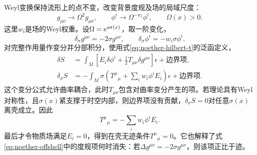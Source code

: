 \begin{example}[Weyl变换与迹恒等式]
Weyl变换保持流形上的点不变，改变背景度规及场的局域尺度：
\begin{equation}
    g_{\mu\nu}\to\Omega^2g_{\mu\nu},
    \qquad\phi^i\to\Omega^{-w_i}\phi^i,
    \qquad\Omega(x)>0.
\end{equation}
这里$w_i$是场的Weyl权重。设$\Omega=\mathrm e^{s\sigma(x)}$，取一阶变化，
\begin{equation}
    \delta_\sigma g^{\mu\nu}=-2\sigma g^{\mu\nu},
    \qquad\delta_\sigma\phi^i=-w_i\sigma\phi^i.
\end{equation}
对完整作用量作变分并分部积分，使用式\eqref{eq:noether-hilbert-t}的泛函定义，
\begin{align}
    \delta S&=\int_M\left[E_i\delta\phi^i
    +\frac12T_{\mu\nu}\delta g^{\mu\nu}\right]\epsilon
    +\text{边界项},\\
    \delta_\sigma S&=-\int_M\sigma
    \left(T^\mu{}_{\mu}+\sum_iw_i\phi^iE_i\right)\epsilon
    +\text{边界项}.
\end{align}
这个变分公式允许曲率耦合，此时$T_{\mu\nu}$包含对曲率变分产生的项。若理论具有Weyl对称性，且$\sigma(x)$紧支撑于时空内部，则边界项没有贡献，$\delta_\sigma S=0$对任意$\sigma(x)$离壳成立。因此
\begin{equation}
    \boxed{T^\mu{}_{\mu}=-\sum_iw_i\phi^iE_i.}
    \label{eq:noether-weyl-identity}
\end{equation}
最后才令物质场满足$E_i=0$，得到在壳无迹条件$T^\mu{}_{\mu}=0$。它也解释了式\eqref{eq:noether-offshell}中的度规项何时消失：若$\Delta g^{\mu\nu}=-2\sigma g^{\mu\nu}$，则该项正比于迹。
\end{example}

